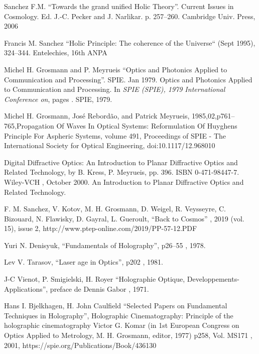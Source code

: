 \documentclass[a4paper,12pt]{article}
\begin{document}
\begin{appendix}
\begin{thebibliography}{1}

 Sanchez F.M. ``Towards the grand unified Holic Theory''. Current Issues in Cosmology. Ed. J.-C. Pecker and J. Narlikar. p. 257--260.
\newblock Cambridge Univ. Press, 2006

 Francis M. Sanchez ``Holic Principle: The coherence of the Universe`` (Sept 1995), 324--344.
\newblock Entelechies, 16th ANPA

 Michel H. Grosmann and P. Meyrueis ``Optics and Photonics Applied to Communication and Processing''. SPIE.  Jan 1979.
\newblock Optics and Photonics Applied to Communication and Processing.
\newblock In {\em SPIE (SPIE), 1979 International Conference on}, pages . SPIE, 1979.
  
 Michel H. Grosmann, José Rebordão,  and Patrick Meyrueis, 1985,02,p761--765,Propagation Of Waves In Optical Systems: Reformulation Of Huyghens Principle For Aspheric Systems, volume 491, Proceedings of SPIE - The International Society for Optical Engineering, doi:10.1117/12.968010

 Digital Diffractive Optics: An Introduction to Planar Diffractive Optics and Related Technology, by B. Kress, P. Meyrueis, pp. 396. ISBN 0-471-98447-7. Wiley-VCH , October 2000.
\newblock An Introduction to Planar Diffractive Optics and Related Technology.

 F. M. Sanchez, V. Kotov, M. H. Grosmann, D. Weigel, R. Veysseyre, C. Bizouard, N. Flawisky, D. Gayral, L. Gueroult, ``Back to Cosmos''
, 2019 (vol. 15), issue 2, http://www.ptep-online.com/2019/PP-57-12.PDF

 Yuri N. Denisyuk, ``Fundamentals of Holography'', p26--55
, 1978.

 Lev V. Tarasov, ``Laser age in Optics'', p202
, 1981.

 J-C Vienot, P. Smigielski, H. Royer ``Holographie Optique, Developpements-Applications'', preface de Dennis Gabor
, 1971.

 Hans I. Bjelkhagen, H. John Caulfield ``Selected Papers on Fundamental Techniques in Holography'', Holographic Cinematography: Principle of the holographic cinematography Victor G. Komar (in 1st European Congress on Optics Applied to Metrology, M. H. Grosmann, editor, 1977) p258, Vol. MS171
, 2001, https://spie.org/Publications/Book/436130


\end{thebibliography}
\end{appendix}
\end{document}
